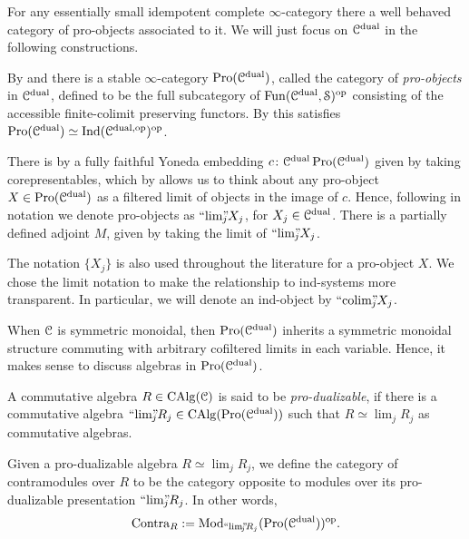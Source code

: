 For any essentially small idempotent complete $\infty$-category there a well behaved category of pro-objects associated to it. We will just focus on $\EuScript{C}^{\mathrm{dual}}$ in the following constructions. 

\begin{construction}
    By \cite[A.8.1.1]{lurie_SAG} and \cite[2.5]{kerz-saito-tamme_2019} there is a stable $\infty$-category $\operatorname{Pro}(\EuScript{C}^{\mathrm{dual}})$, called the category of \emph{pro-objects} in $\EuScript{C}^{\mathrm{dual}}$, defined to be the full subcategory of $\operatorname{Fun}(\EuScript{C}^{\mathrm{dual}}, \EuScript{S})^{\mathrm{op}}$ consisting of the accessible finite-colimit preserving functors. By \cite[A.8.1.2]{lurie_SAG} this satisfies $\operatorname{Pro}(\EuScript{C}^{\mathrm{dual}}) \simeq \operatorname{Ind}(\EuScript{C}^{\mathrm{dual}, \mathrm{op}})^{\mathrm{op}}$. 
\end{construction}

There is by \cite[A.8.1.3]{lurie_SAG} a fully faithful Yoneda embedding $c\colon \EuScript{C}^{\mathrm{dual}} \operatorname{Pro}(\EuScript{C}^{\mathrm{dual}})$ given by taking corepresentables, which by \cite[A.8.1.5]{lurie_SAG} allows us to think about any pro-object $X \in \operatorname{Pro}(\EuScript{C}^{\mathrm{dual}})$ as a filtered limit of objects in the image of $c$. Hence, following \cite{kerz-saito-tamme_2019} in notation we denote pro-objects as $``\!\lim\!"_{\hspace{-5pt} j} X_j$, for $X_j \in \EuScript{C}^{\mathrm{dual}}$. There is a partially defined adjoint $M$, given by taking the limit of $``\!\lim\!"_{\hspace{-5pt} j} X_j$. 

\begin{remark}
    The notation $\{X_j\}$ is also used throughout the literature for a pro-object $X$. We chose the limit notation to make the relationship to ind-systems more transparent. In particular, we will denote an ind-object by $``\!\operatorname{colim}\!"_{\hspace{-5pt} j} X_j$. 
\end{remark}

When $\EuScript{C}$ is symmetric monoidal, then $\operatorname{Pro}(\EuScript{C}^{\mathrm{dual}})$ inherits a symmetric monoidal structure commuting with arbitrary cofiltered limits in each variable. Hence, it makes sense to discuss algebras in $\operatorname{Pro}(\EuScript{C}^{\mathrm{dual}})$. 

\begin{definition}
    A commutative algebra $R\in \operatorname{CAlg}(\EuScript{C})$ is said to be \emph{pro-dualizable}, if there is a commutative algebra $``\!\lim\!"_{\hspace{-5pt} j} R_j \in \operatorname{CAlg}(\operatorname{Pro}(\EuScript{C}^{\mathrm{dual}}))$ such that $R\simeq \lim_j R_j$ as commutative algebras.  
\end{definition}

\begin{definition}
    Given a pro-dualizable algebra $R \simeq \lim_j R_j$, we define the category of contramodules over $R$ to be the category opposite to modules over its pro-dualizable presentation $``\!\lim\!"_{\hspace{-5pt} j} R_j$. In other words, 
    \[\mathrm{Contra}_R := \mathrm{Mod}_{``\!\lim\!"_{\hspace{-5pt} j} R_j}(\operatorname{Pro}(\EuScript{C}^{\mathrm{dual}}))^{\mathrm{op}}.\]
\end{definition}

